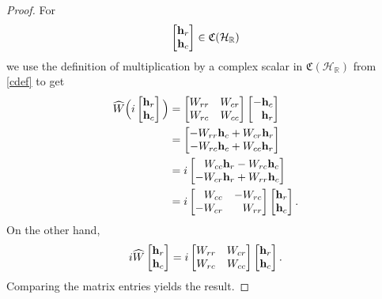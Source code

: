 \documentclass{dis}
\newcommand{\phm}{\phantom{-}}
\theoremstyle{plain}
\theoremstyle{definition}
\def\R{\mathbb{R}}
\renewcommand{\vec}[1]{{\bf #1}}
\newcommand{\0}{{\color{lightgray}0}}
\begin{document}
\begin{proof}
For 
$$\begin{bmatrix} \vec{h}_r\\ \vec{h}_c\end{bmatrix}\in \mathfrak{C}(\mathcal{H}_{\R})$$ we use the definition of multiplication by a complex scalar in $\mathfrak{C}(\mathcal{H}_{\R})$ from \eqref{cdef} to get 
\begin{align*}
\widehat{W}\Big(i \begin{bmatrix} \vec{h}_r\\ \vec{h}_c\end{bmatrix}\Big) & = \begin{bmatrix} W_{rr} & W_{cr}\\ W_{rc} & W_{cc}\end{bmatrix} \begin{bmatrix} -\vec{h}_{c}\\ \phm\vec{h}_{r}\end{bmatrix}\\
& = \begin{bmatrix} - W_{rr} \vec{h}_c + W_{cr} \vec{h}_r\\ -W_{rc} \vec{h}_c + W_{cc} \vec{h}_{r}\end{bmatrix}\\
& = i  \begin{bmatrix}\phm W_{cc} \vec{h}_r - W_{rc} \vec{h}_c\\ - W_{cr} \vec{h}_r + W_{rr} \vec{h}_c\end{bmatrix}\\
& =i  \begin{bmatrix} \phm W_{cc} & - W_{rc}\\ -W_{cr} & \phantom{-}W_{rr}\end{bmatrix}\begin{bmatrix} \vec{h}_{r}\\ \vec{h}_{c}\end{bmatrix}.
\end{align*}
On the other hand,
$$i \widehat{W} \begin{bmatrix} \vec{h}_r\\ \vec{h}_c\end{bmatrix} =  i \begin{bmatrix} W_{rr} & W_{cr}\\ W_{rc} & W_{cc}\end{bmatrix} \begin{bmatrix} \vec{h}_r\\ \vec{h}_c\end{bmatrix}.$$
Comparing the matrix entries yields the result.
\end{proof}
\end{document}
